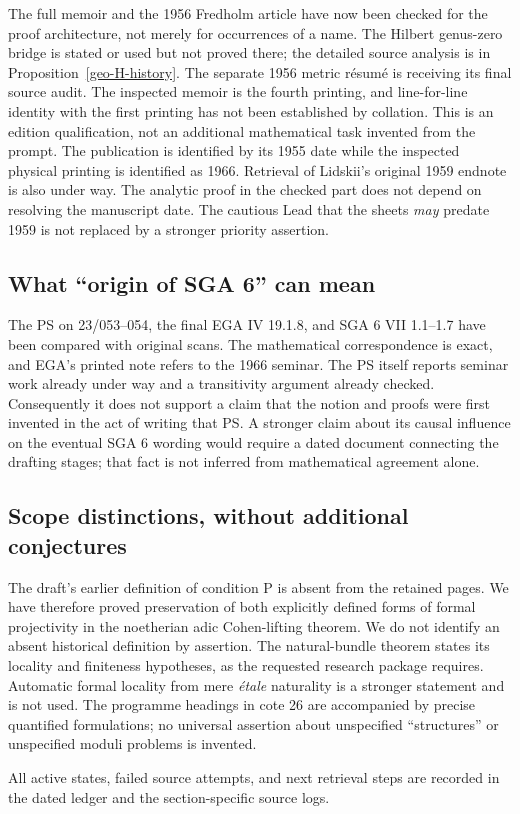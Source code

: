 The full memoir and the 1956 Fredholm article have now been checked
for the proof architecture, not merely for occurrences of a name.
The Hilbert genus-zero bridge is stated or used but not proved there;
the detailed source analysis is in Proposition~\ref{geo-H-history}.
The separate 1956 metric r\'esum\'e is receiving its final source audit.
The inspected memoir is the fourth printing, and line-for-line identity
with the first printing has not been established by collation. This
is an edition qualification, not an additional mathematical task
invented from the prompt. The publication is identified by its 1955
date while the inspected physical printing is identified as 1966.
Retrieval of Lidskii's original 1959 endnote is also under way.
The analytic proof in the checked part does not depend on resolving
the manuscript date. The cautious Lead that the sheets \emph{may}
predate 1959 is not replaced by a stronger priority assertion.

\subsection{What ``origin of SGA 6'' can mean}

The PS on 23/053--054, the final EGA IV 19.1.8, and SGA 6 VII
1.1--1.7 have been compared with original scans. The mathematical
correspondence is exact, and EGA's printed note refers to the 1966
seminar. The PS itself reports seminar work already under way and a
transitivity argument already checked. Consequently it does not
support a claim that the notion and proofs were first invented in
the act of writing that PS. A stronger claim about its causal
influence on the eventual SGA 6 wording would require a dated
document connecting the drafting stages; that fact is not inferred
from mathematical agreement alone.

\subsection{Scope distinctions, without additional conjectures}

The draft's earlier definition of condition P is absent from the retained
pages. We have therefore proved preservation of both explicitly defined
forms of formal projectivity in the noetherian adic Cohen-lifting theorem.
We do not identify an absent historical definition by assertion.
The natural-bundle theorem states its locality and finiteness hypotheses,
as the requested research package requires. Automatic formal locality
from mere \emph{\'etale} naturality is a stronger statement and is not
used. The programme headings in cote 26 are accompanied by precise
quantified formulations; no universal assertion about unspecified
``structures'' or unspecified moduli problems is invented.

All active states, failed source attempts, and next retrieval steps are
recorded in the dated ledger and the section-specific source logs.
